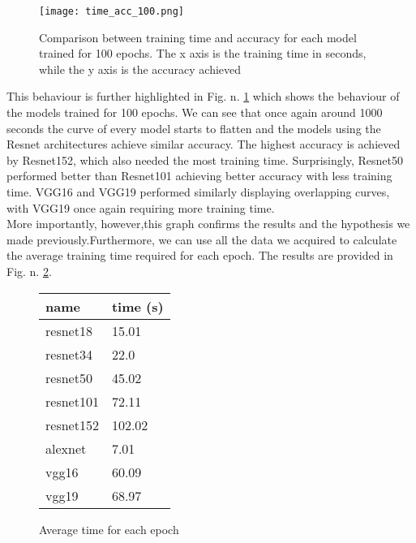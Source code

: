 \begin{figure}[h]
       \centering 
	    \texttt{[image: time\_acc\_100.png]}
        \caption[Comparison between training time and accuracy for each model for 100 epochs]{Comparison between training time and accuracy for each model trained for 100 epochs. The x axis is the training time in seconds, while the y axis is the accuracy achieved}
         \label{fig:time_acc_100}
\end{figure}




This behaviour is further highlighted in Fig. n. \ref{fig:time_acc_100} which shows the behaviour of the models trained for 100 epochs. We can see that once again around 1000 seconds the curve of every model starts to flatten and the models using the Resnet architectures achieve similar accuracy. The highest accuracy is achieved by Resnet152, which also needed the most training time. Surprisingly, Resnet50 performed better than Resnet101 achieving better accuracy with less training time.
VGG16 and VGG19 performed similarly displaying overlapping curves, with VGG19 once again requiring more training time. \\
More importantly, however,this graph confirms the results and the hypothesis we made previously.Furthermore, we can use all the data we acquired to calculate the average training time required for each epoch. The results are provided in Fig. n. \ref{fig:time_f_epoch}.
\begin{figure}[h]
\centering
\begin{tabular}{ p{2cm} p{2cm}   }
 name&time (s)\\
 \hline
resnet18&15.01\\
resnet34&22.0\\
resnet50&45.02\\
resnet101&72.11\\
resnet152&102.02\\
alexnet&7.01\\
vgg16&60.09\\
vgg19&68.97\\
 \hline
\end{tabular}
\caption{Average time for each epoch}
\label{fig:time_f_epoch}
\end{figure}

